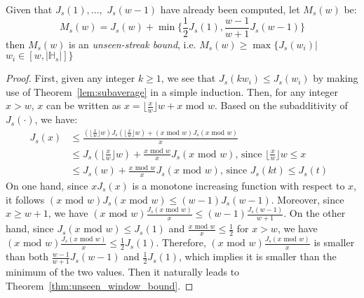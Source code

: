 \begin{theorem}
\label{thm:unseen_window_bound}
Given that $J_s(1),\ldots,$ $J_s(w-1)$ have already been computed, 
let $M_s(w)$ be:
\begin{equation}
M_s(w) = J_s(w) + \min\{\frac{1}{2}J_s(1),\frac{w-1}{w+1}J_s(w-1)\}
\end{equation} 
then $M_s(w)$ is an \emph{unseen-streak bound}, i.e. $M_s(w) \geq \max\{J_s(w_i) | $ $ w_i\in [w,|\mathbb{H}_s|]\}$
\end{theorem}
\begin{proof}
First, given any integer $k \geq 1$, we see that $J_s(kw_i) \leq J_s(w_i)$ 
by making use of Theorem~\ref{lem:subaverage} in a simple induction. 
Then, for any integer $x > w$, 
$x$ can be written as $x =\lfloor \frac{x}{w} \rfloor w + x \text{ mod } w$. 
Based on the subadditivity of $J_s(\cdot)$, we have: 
\begin{align*}
J_s(x) &\leq \frac{(\lfloor \frac{x}{w}  \rfloor w) J_s(\lfloor \frac{x}{w}  \rfloor w) + (x \text{ mod } w ) J_s(x \text{ mod } w)}{x} \\
&\leq J_s(\lfloor \frac{x}{w}  \rfloor w) + \frac{x \text{ mod } w}{x} J_s(x \text{ mod } w) \text{, since  $\lfloor \frac{x}{w}  \rfloor  w \leq x $} \\
&\leq J_s(w) + \frac{x \text{ mod } w}{x} J_s(x \text{ mod } w) \text{, since $J_s(kt) \leq J_s(t)$ }
\end{align*}
On one hand, since $xJ_s(x)$ is a monotone increasing function with respect to $x$, it follows $(x \text{ mod } w)J_s(x \text{ mod } w) \leq (w-1)J_s(w-1)$. 
Moreover, since $x \geq w+1$, we have $(x \text{ mod } w)\frac{J_s(x \text{ mod } w)}{x}\leq (w-1)\frac{J_s(w-1)}{w+1}$. On the other hand, since $J_s(x \text{ mod } w)\leq J_s(1)$ and $\frac{x \text{ mod } w}{x} \leq \frac{1}{2}$ for $x > w$, we have $(x \text{ mod } w)\frac{J_s(x \text{ mod } w)}{x} \leq \frac{1}{2}J_s(1)$. Therefore, $(x \text{ mod } w)\frac{J_s(x \text{ mod } w)}{x}$ is smaller than both $\frac{w-1}{w+1}J_s(w-1)$ and $\frac{1}{2}J_s(1)$, which implies it is smaller than the minimum of the two values. 
Then it naturally leads to Theorem~\ref{thm:unseen_window_bound}. 
\end{proof}


